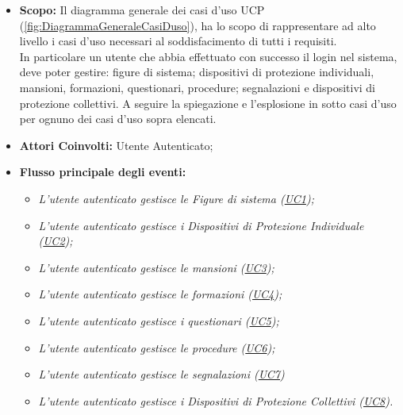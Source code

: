 	\begin{itemize}
		\item \textbf{Scopo:} Il diagramma generale dei casi d'uso UCP (\autoref{fig:DiagrammaGeneraleCasiDuso}), ha lo scopo di rappresentare ad alto livello i casi d'uso necessari al soddisfacimento di tutti i requisiti. \\
		In particolare un utente che abbia effettuato con successo il login nel sistema, deve poter gestire: figure di sistema; dispositivi di protezione individuali, mansioni, formazioni, questionari, procedure; segnalazioni e dispositivi di protezione collettivi.
		A seguire la spiegazione e l'esplosione in sotto casi d'uso per ognuno dei casi d'uso sopra elencati.
		\item \textbf{Attori Coinvolti:} Utente Autenticato;
		\item \textbf{Flusso principale degli eventi:} 
			\begin{itemize}
				\item \textit{L'utente autenticato gestisce le Figure di sistema (\hyperref[section:UC1]{UC1});}
				\item \textit{L'utente autenticato gestisce i Dispositivi di Protezione Individuale (\hyperref[section:UC2]{UC2});}
				\item \textit{L'utente autenticato gestisce le mansioni (\hyperref[section:UC3]{UC3});}
				\item \textit{L'utente autenticato gestisce le formazioni (\hyperref[section:UC4]{UC4});}
				\item \textit{L'utente autenticato gestisce i questionari (\hyperref[section:UC5]{UC5});}
				\item \textit{L'utente autenticato gestisce le procedure (\hyperref[section:UC6]{UC6});}
				\item \textit{L'utente autenticato gestisce le segnalazioni (\hyperref[section:UC7]{UC7})}
				\item \textit{L'utente autenticato gestisce i Dispositivi di Protezione Collettivi (\hyperref[section:UC8]{UC8}).}
			\end{itemize}
	\end{itemize}
	

